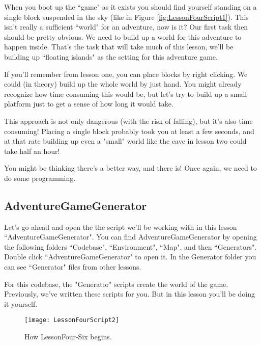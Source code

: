 \documentclass{article}
\begin{document}
When you boot up the ``game" as it exists you should find yourself standing on a single block suspended in the sky (like in Figure \ref{fig:LessonFourScript1}). This isn't really a sufficient ``world" for an adventure, now is it? Our first task then should be pretty obvious. We need to build up a world for this adventure to happen inside. That's the task that will take much of this lesson, we'll be building up ``floating islands" as the setting for this adventure game.

If you'll remember from lesson one, you can place blocks by right clicking. We could (in theory) build up the whole world by just hand. You might already recognize how time consuming this would be, but let's try to build up a small platform just to get a sense of how long it would take.

\noindent{}

This approach is not only dangerous (with the risk of falling), but it's also time consuming! Placing a single block probably took you at least a few seconds, and at that rate building up even a "small" world like the cave in lesson two could take half an hour!

You might be thinking there's a better way, and there is! Once again, we need to do some programming.

\subsection{AdventureGameGenerator}

Let's go ahead and open the the script we'll be working with in this lesson ``AdventureGameGenerator". You can find AdventureGameGenerator by opening the following folders ``Codebase", ``Environment", ``Map", and then ``Generators". Double click ``AdventureGameGenerator" to open it. In the Generator folder you can see ``Generator" files from other lessons. 

For this codebase, the "Generator" scripts create the world of the game. Previously, we've written these scripts for you. But in this lesson you'll be doing it yourself. 

\begin{figure}
  \texttt{[image: LessonFourScript2]}
  \caption{How LessonFour-Six begins.}
  \label{fig:LessonFourScript2}
\end{figure}
\end{document}
